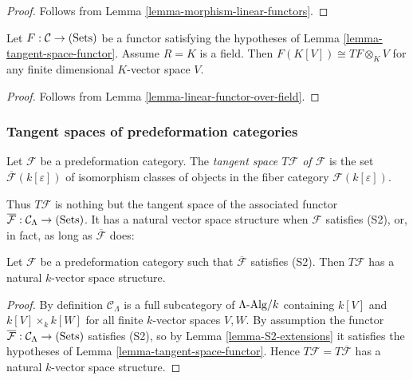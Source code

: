 \begin{proof}
Follows from Lemma \ref{lemma-morphism-linear-functors}.
\end{proof}

\begin{lemma}
\label{lemma-tangent-space-tensor}
Let $F: \mathcal C \rightarrow \textnormal{(Sets)}$ be a functor satisfying the 
hypotheses of Lemma \ref{lemma-tangent-space-functor}.  Assume $R = K$ is a 
field.  Then $F(K[V]) \cong TF \otimes_{K} V$ for any finite dimensional 
$K$-vector space $V$.
\end{lemma}

\begin{proof}
Follows from Lemma \ref{lemma-linear-functor-over-field}.
\end{proof}

\subsubsection{Tangent spaces of predeformation categories}
\label{section-tangent-spaces}
\begin{definition}
\label{definition-tangent-space}
Let $\mathcal F$ be a predeformation category.  The \emph{tangent space $T 
\mathcal F$ of $\mathcal F$} is the set $\overline{\mathcal F}(k[\varepsilon])$ 
of isomorphism classes of objects in the fiber category $\mathcal 
F(k[\varepsilon])$.
\end{definition}

\noindent
Thus $T \mathcal F$ is nothing but the tangent space of the associated functor 
$\overline{\mathcal F}: \mathcal{C}_{\Lambda} \rightarrow \textnormal{(Sets)}$. 
It has a natural vector space structure when $\mathcal F$ satisfies (S2), or, 
in fact, as long as $\overline{\mathcal F}$ does:
\begin{lemma}
\label{lemma-tangent-space-vector-space}
Let $\mathcal F$ be a predeformation category such that $\overline{\mathcal F}$ 
satisfies \textnormal{(S2)}. Then $T \mathcal F$ has a natural $k$-vector space 
structure.
\end{lemma}

\begin{proof}
By definition $\mathcal C_{\Lambda}$ is a full subcategory of 
$\Lambda\textnormal{-Alg}/k$ containing $k[V]$ and $k[V] \times_{k} k[W]$ for 
all finite $k$-vector spaces $V,W$.  By assumption the functor 
$\overline{\mathcal F}: \mathcal C_{\Lambda} \rightarrow \textnormal{(Sets)}$ 
satisfies (S2), so by Lemma \ref{lemma-S2-extensions} it satisfies the 
hypotheses of Lemma \ref{lemma-tangent-space-functor}.  Hence $T \mathcal F = T 
\overline{\mathcal F}$ has a natural $k$-vector space structure.
\end{proof}

